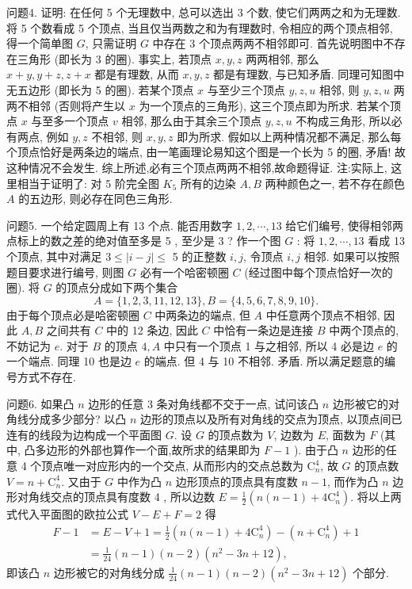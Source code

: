 问题4. 证明: 在任何 5 个无理数中, 总可以选出 3 个数, 使它们两两之和为无理数.
将 5 个数看成 5 个顶点, 当且仅当两数之和为有理数时, 令相应的两个顶点相邻, 得一个简单图 $G$, 只需证明 $G$ 中存在 3 个顶点两两不相邻即可.
首先说明图中不存在三角形 (即长为 3 的圈). 事实上, 若顶点 $x, y, z$ 两两相邻, 那么 $x+y, y+z, z+x$ 都是有理数, 从而 $x, y, z$ 都是有理数, 与已知矛盾.
同理可知图中无五边形 (即长为 5 的圈).
若某个顶点 $x$ 与至少三个顶点 $y, z, u$ 相邻, 则 $y, z, u$ 两两不相邻 (否则将产生以 $x$ 为一个顶点的三角形), 这三个顶点即为所求.
若某个顶点 $x$ 与至多一个顶点 $v$ 相邻, 那么由于其余三个顶点 $y, z, u$ 不构成三角形, 所以必有两点, 例如 $y, z$ 不相邻, 则 $x, y, z$ 即为所求.
假如以上两种情况都不满足, 那么每个顶点恰好是两条边的端点, 由一笔画理论易知这个图是一个长为 5 的圈, 矛盾! 故这种情况不会发生.
综上所述,必有三个顶点两两不相邻,故命题得证.
注:实际上, 这里相当于证明了: 对 5 阶完全图 $K_5$ 所有的边染 $A, B$ 两种颜色之一, 若不存在颜色 $A$ 的五边形, 则必存在同色三角形.



问题5. 一个给定圆周上有 13 个点.
能否用数字 $1,2, \cdots, 13$ 给它们编号, 使得相邻两点标上的数之差的绝对值至多是 5 , 至少是 3 ?
作一个图 $G$ : 将 $1,2, \cdots, 13$ 看成 13 个顶点, 其中对满足 $3 \leqslant|i-j| \leqslant$ 5 的正整数 $i, j$, 令顶点 $i, j$ 相邻.
如果可以按照题目要求进行编号, 则图 $G$ 必有一个哈密顿圈 $C$ (经过图中每个顶点恰好一次的圈).
将 $G$ 的顶点分成如下两个集合
$$
A=\{1,2,3,11,12,13\}, B=\{4,5,6,7,8,9,10\} .
$$
由于每个顶点必是哈密顿圈 $C$ 中两条边的端点, 但 $A$ 中任意两个顶点不相邻, 因此 $A, B$ 之间共有 $C$ 中的 12 条边, 因此 $C$ 中恰有一条边是连接 $B$ 中两个顶点的, 不妨记为 $e$.
对于 $B$ 的顶点 $4, A$ 中只有一个顶点 1 与之相邻, 所以 4 必是边 $e$ 的一个端点.
同理 10 也是边 $e$ 的端点.
但 4 与 10 不相邻.
矛盾.
所以满足题意的编号方式不存在.



问题6. 如果凸 $n$ 边形的任意 3 条对角线都不交于一点, 试问该凸 $n$ 边形被它的对角线分成多少部分?
以凸 $n$ 边形的顶点以及所有对角线的交点为顶点, 以顶点间已连有的线段为边构成一个平面图 $G$. 设 $G$ 的顶点数为 $V$, 边数为 $E$, 面数为 $F$ (其中, 凸多边形的外部也算作一个面,故所求的结果即为 $F-1$ ).
由于凸 $n$ 边形的任意 4 个顶点唯一对应形内的一个交点, 从而形内的交点总数为 $\mathrm{C}_n^4$, 故 $G$ 的顶点数 $V=n+\mathrm{C}_n^4$.
又由于 $G$ 中作为凸 $n$ 边形顶点的顶点具有度数 $n-1$, 而作为凸 $n$ 边形对角线交点的顶点具有度数 4 , 所以边数 $E=\frac{1}{2}\left(n(n-1)+4 \mathrm{C}_n^4\right)$.
将以上两式代入平面图的欧拉公式 $V-E+F=2$ 得
$$
\begin{aligned}
F-1 & =E-V+1=\frac{1}{2}\left(n(n-1)+4 \mathrm{C}_n^4\right)-\left(n+\mathrm{C}_n^4\right)+1 \\
& =\frac{1}{24}(n-1)(n-2)\left(n^2-3 n+12\right),
\end{aligned}
$$
即该凸 $n$ 边形被它的对角线分成 $\frac{1}{24}(n-1)(n-2)\left(n^2-3 n+12\right)$ 个部分.



